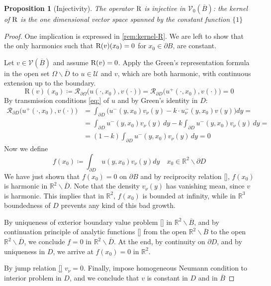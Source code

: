 \documentclass[10pt, a4paper, twoside, openright]{book}
\theoremstyle{definition}
\theoremstyle{plain}
\theoremstyle{plain}
\theoremstyle{plain}
\newtheorem{proposition}[subsection]{Proposition}
\theoremstyle{plain}
\theoremstyle{plain}
\theoremstyle{plain}
\theoremstyle{plain}
\theoremstyle{plain}
\begin{document}
\begin{proposition}[Injectivity]
\label{prop:injectivity}
 The operator $\textup{R}$ is injective in $\mathcal{V}_0(\overline{B})$: the kernel of $\textup{R}$ is the one dimensional vector space spanned by the constant function $\{1\}$
\end{proposition}
\begin{proof}
\label{proof:injectivity}
One implication is expressed in \ref{rem:kernel-R}. We are left to show that the only harmonics such that $\textup{R}(v)(x_0)=0$ for $x_0\in\partial B$, are constant.
\par
Let $v\in\mathcal{V}(\overline{B})$ and assume $\textup{R}(v)=0$. Apply the Green's representation formula in the open set $\Omega\backslash\overline{D}$ to $u\in\mathcal{U}$ and $v$, which are both harmonic, with continuous extension up to the boundary.
\begin{equation}
  \text{R}(v)(x_0)\coloneqq\mathcal{R}_{\partial\Omega}\bigl(u(\cdot,x_0),v(\cdot)\bigr) = \mathcal{R}_{\partial D}\bigl(u^+(\cdot,x_0),v(\cdot)\bigr) = 0
 \end{equation}
 By transmission conditions \ref{eq:} of $u$ and by Green's identity in $D$:
 \begin{align*}
  \mathcal{R}_{\partial D}\bigl(u^+(\cdot,x_0),v(\cdot)\bigr) &= \int_{\partial D}\bigl(u^-(y,x_0)v_\nu (y) - k \cdot u^-_\nu(y,x_0)v(y)\bigr)dy = \\
  &= \int_{\partial D}u^-(y,x_0)v_\nu (y)\,dy - k\int_{\partial D}u^-(y,x_0)v_\nu (y)\,dy = \\
  &= (1-k)\int_{\partial D}u^-(y,x_0)v_\nu (y)\,dy = 0
 \end{align*}
 Now we define
 \begin{equation}
  f(x_0)\coloneqq \int_{\partial D} u(y,x_0)v_\nu(y)dy\quad x_0 \in \mathbb{R}^2\backslash\partial D
 \end{equation}
 We have just shown that $f(x_0)=0$ on $\partial B$ and 
 by reciprocity relation \ref{}, $f(x_0)$ is harmonic in $\mathbb{R}^2\backslash\overline{D}$.
 Note that the density $v_\nu(y)$ has vanishing mean, since $v$ is harmonic. This implies that in $\mathbb{R}^2$, $f(x_0)$ is bounded at infinity, while in $\mathbb{R}^3$ boundedness of $D$ prevents any kind of this bad growth.
 \par
 By uniqueness of exterior boundary value problem \ref{} in $\mathbb{R}^2\backslash\overline{B}$, and by continuation principle of analytic functions \ref{} from the open $\mathbb{R}^2\backslash\overline{B}$ to the open $\mathbb{R}^2\backslash\overline{D}$, we conclude $f=0$ in $\mathbb{R}^2\backslash\overline{D}$.
 At the end, by continuity on $\partial D$, and by uniqueness in $D$, we arrive at $f(x_0)=0$ in $\mathbb{R}^2$.
 \par
 By jump relation \ref{} $v_\nu = 0$. Finally, impose homogeneous Neumann condition to interior problem in $D$, and we conclude that $v$ is constant in $D$ and in $\overline{B}$
\end{proof}
\end{document}
